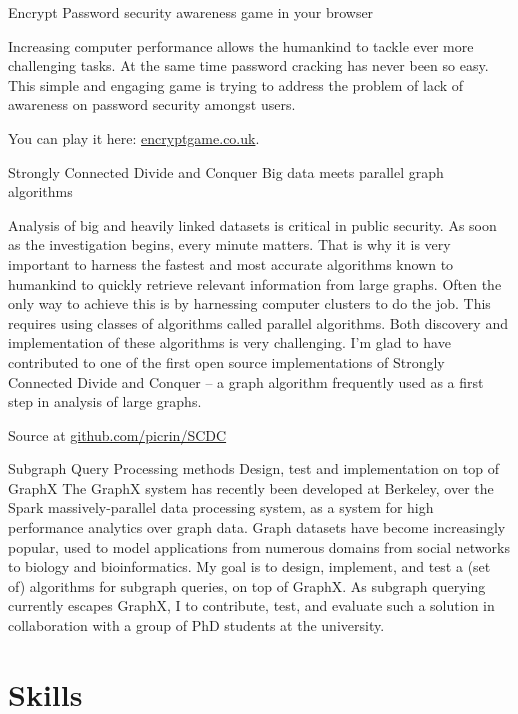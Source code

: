 \documentclass{tccv}
\begin{document}
\begin{eventlist}

\item{Encrypt}
     {Password security awareness game in your browser}
     {Increasing computer performance allows the humankind to tackle ever more challenging tasks. At the same time password cracking has never been so easy. This simple and engaging game is trying to address the problem of lack of awareness on password security amongst users. \par\medskip You can play it here: \href{encryptgame.co.uk}{encryptgame.co.uk}.
     }

\item{Strongly Connected Divide and Conquer}
   {Big data meets parallel graph algorithms}
   {Analysis of big and heavily linked datasets is critical in public security. As soon as the investigation begins, every minute matters. That is why it is very important to harness the fastest and most accurate algorithms known to humankind to quickly retrieve relevant information from large graphs. Often the only way to achieve this is by harnessing computer clusters to do the job. This requires using classes of algorithms called parallel algorithms. Both discovery and implementation of these algorithms is very challenging. I'm glad to have contributed to one of the first open source implementations of Strongly Connected Divide and Conquer -- a graph algorithm frequently used as a first step in analysis of large graphs. \par\medskip
   Source at
   \href{http://github.com/picrin/SCDC}{github.com/picrin/SCDC}
   }

\item{Subgraph Query Processing methods}
    {Design, test and implementation on top of GraphX }
    {The GraphX system has recently been developed at Berkeley, over the Spark massively-parallel data processing system, as a system for high performance analytics over graph data. Graph datasets have become increasingly popular, used to model applications from numerous domains from social networks to biology and bioinformatics. My goal is to design, implement, and test a (set of) algorithms for subgraph queries, on top of GraphX. As subgraph querying currently escapes GraphX, I to contribute, test, and evaluate such a solution in collaboration with a group of PhD students at the university.}

\end{eventlist}

\section{Skills}
\end{document}
